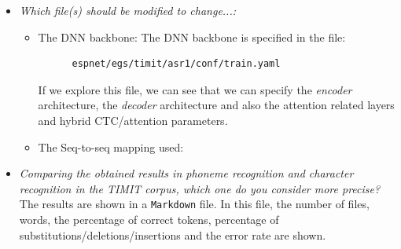 \documentclass[a4paper]{article}
\def\inline{\lstinline[basicstyle=\ttfamily,keywordstyle={}]}
\begin{document}
\begin{itemize}
  \item \emph{Which file(s) should be modified to change...:}\\
        \begin{itemize}
          \item The DNN backbone: The DNN backbone is specified in the file:
                \begin{verbatim}
      espnet/egs/timit/asr1/conf/train.yaml
    \end{verbatim}
                If we explore this file, we can see that we can specify the \emph{encoder} architecture, the \emph{decoder} architecture and also the attention related layers and hybrid CTC/attention parameters.
          \item The Seq-to-seq mapping used:
        \end{itemize}

  \item \emph{Comparing the obtained results in phoneme recognition and character recognition in the TIMIT corpus, which one do you consider more precise?}\\

        The results are shown in a \inline{Markdown} file. In this file, the number of files, words, the percentage of correct tokens, percentage of substitutions/deletions/insertions and the error rate are shown.


\end{itemize}
\end{document}
